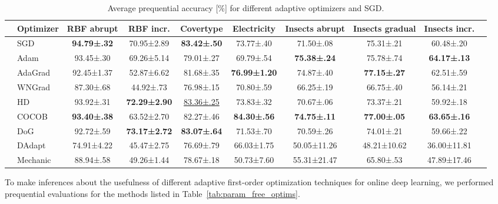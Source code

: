 \documentclass[letterpaper]{article} %
\begin{document}
\begin{table}[h]
	\centering
	\small
	\begin{tabular}{llcccccccc}
		\toprule
		                                                   & Optimizer & RBF abrupt          & RBF incr.            & Covertype             & Electricity          & Insects abrupt      & Insects gradual     & Insects incr.       \\
		\midrule
		\multirow{5}{*}{\rotatebox[origin=c]{90}{Tuned}}   & SGD       & \bfseries 94.79±.32 & 70.95±2.89           & \bfseries 83.42±.50   & 73.77±.40            & 71.50±.08           & 75.31±.21           & 60.48±.20           \\
		                                                   & Adam      & 93.45±.30           & 69.26±5.14           & 79.01±.27             & 69.79±.54            & \bfseries 75.38±.24 & 75.78±.74           & \bfseries 64.17±.13 \\
		                                                   & AdaGrad   & 92.45±1.37          & 52.87±6.62           & 81.68±.35             & \bfseries 76.99±1.20 & 74.87±.40           & \bfseries 77.15±.27 & 62.51±.59           \\
		                                                   & WNGrad    & 87.30±.68           & 44.92±.73            & 76.98±.15             & 70.80±.59            & 66.25±.19           & 66.75±.40           & 56.14±.21           \\
		                                                   & HD        & 93.92±.31           & \bfseries 72.29±2.90 & \underline{83.36±.25} & 73.83±.32            & 70.67±.06           & 73.37±.21           & 59.92±.18           \\ \midrule
		\multirow{4}{*}{\rotatebox[origin=c]{90}{LR-Free}} & COCOB     & \bfseries 93.40±.38 & 63.52±2.70           & 82.27±.46             & \bfseries 84.30±.56  & \bfseries 74.75±.11 & \bfseries 77.00±.05 & \bfseries 63.65±.16 \\
		                                                   & DoG       & 92.72±.59           & \bfseries 73.17±2.72 & \bfseries 83.07±.64   & 71.53±.70            & 70.59±.26           & 74.01±.21           & 59.66±.22           \\
		                                                   & DAdapt    & 74.91±4.22          & 45.47±2.75           & 76.69±.79             & 66.03±1.75           & 50.05±11.26         & 48.21±10.62         & 36.00±11.81         \\
		                                                   & Mechanic  & 88.94±.58           & 49.26±1.44           & 78.67±.18             & 50.73±7.60           & 55.31±21.47         & 65.80±.53           & 47.89±17.46         \\
		\bottomrule
	\end{tabular}
	\caption{Average prequential accuracy [\%] for different adaptive optimizers and SGD.}
	\label{tab:results_adaptive_optims}
\end{table}
To make inferences about the usefulness of different adaptive first-order optimization techniques for online deep learning, we performed prequential evaluations for the methods listed in Table~\ref{tab:param_free_optims}.
\end{document}
